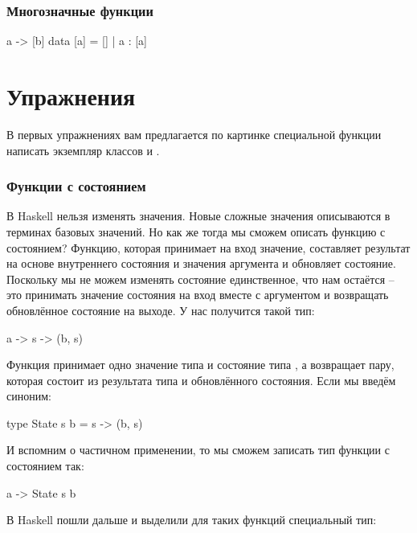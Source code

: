 \subsubsection{Многозначные функции}


\begin{code}
a -> [b]
data [a] = [] | a : [a]
\end{code}

\section{Упражнения}

В первых упражнениях вам предлагается по картинке специальной функции
написать экземпляр классов  и .

\subsubsection{Функции с состоянием}


 В Haskell нельзя изменять значения. Новые
сложные значения описываются в терминах базовых значений. Но как же
тогда мы сможем описать функцию с состоянием? Функцию, которая принимает
на вход значение, составляет результат на основе внутреннего состояния и
значения аргумента и обновляет состояние. Поскольку мы не можем изменять
состояние единственное, что нам остаётся -- это принимать значение
состояния на вход вместе с аргументом и возвращать обновлённое состояние
на выходе. У нас получится такой тип:


\begin{code}
a -> s -> (b, s)
\end{code}

Функция принимает одно значение типа  и состояние типа , а
возвращает пару, которая состоит из результата типа  и
обновлённого состояния. Если мы введём синоним:


\begin{code}
type State s b = s -> (b, s)
\end{code}

И вспомним о частичном применении, то мы сможем записать тип функции с
состоянием так:


\begin{code}
a -> State s b 
\end{code}

В Haskell пошли дальше и выделили для таких функций специальный тип:


